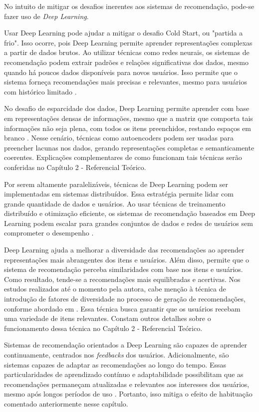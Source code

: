 No intuito de mitigar os desafios inerentes aos sistemas de recomendação, pode-se fazer uso de \textit{Deep Learning}.

Usar Deep Learning pode ajudar a mitigar o desafio Cold Start, ou "partida a frio". Isso ocorre, pois Deep Learning 
permite aprender representações complexas a partir de dados brutos. Ao utilizar técnicas como redes neurais, os sistemas 
de recomendação podem extrair padrões e relações significativas dos dados, mesmo quando há poucos dados disponíveis para
novos usuários. Isso permite que o sistema forneça recomendações mais precisas e relevantes, mesmo para usuários com 
histórico limitado \cite{expressanalytics-cold-start-problem}.

No desafio de esparcidade dos dados, Deep Learning permite aprender com base em representações densas de informações, 
mesmo que a matriz que comporta tais informações não seja plena, com todos os itens preenchidos, restando espaços em branco
\cite{HEIDARI2022109835}. Nesse cenário, técnicas como autoencoders podem ser usadas para preencher lacunas nos 
dados, gerando representações completas e semanticamente coerentes. Explicações complementares de como funcionam tais 
técnicas serão conferidas no Capítulo 2 - Referencial Teórico.

Por serem altamente paralelizáveis, técnicas de Deep Learning podem ser implementadas em sistemas distribuídos. 
Essa estratégia permite lidar com grande quantidade de dados e usuários. Ao usar técnicas de treinamento distribuído e 
otimização eficiente, os sistemas de recomendação baseados em Deep Learning podem escalar para grandes conjuntos de dados
e redes de usuários sem comprometer o desempenho \cite{10.1145/2783258.2783270}.

Deep Learning ajuda a melhorar a diversidade das recomendações ao aprender representações
mais abrangentes dos itens e usuários. Além disso, permite que o sistema de recomendação perceba similaridades com 
base nos itens e usuários. Como resultado, tende-se a recomendações mais equilibradas e acertivas. Nos estudos realizados 
até o momento pela autora, cabe menção à técnica de introdução de fatores de diversidade no processo de geração de 
recomendações, conforme abordado em \cite{kingma2016improving}. Essa técnica busca garantir que os usuários recebam uma variedade de 
itens relevantes. Constam outros detalhes sobre o funcionamento dessa técnica no Capítulo 2 - Referencial Teórico.

Sistemas de recomendação orientados a Deep Learning são capazes de aprender continuamente, centrados nos \textit{feedbacks}
dos usuários. Adicionalmente, são sistemas capazes de adaptar as recomendações ao longo do tempo.
Essas particularidades de aprendizado contínuo e adaptabilidade possibilitam que as recomendações permaneçam atualizadas
e relevantes aos interesses dos usuários, mesmo após longos períodos de uso \cite{lomonaco2019continual}. Portanto, isso mitiga o efeito de
habituação comentado anteriormente nesse capítulo.

